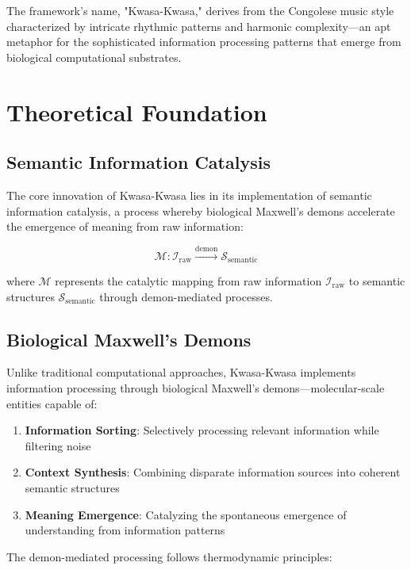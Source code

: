 \documentclass[12pt,a4paper]{article}
\begin{document}
The framework's name, "Kwasa-Kwasa," derives from the Congolese music style characterized by intricate rhythmic patterns and harmonic complexity—an apt metaphor for the sophisticated information processing patterns that emerge from biological computational substrates.

\section{Theoretical Foundation}

\subsection{Semantic Information Catalysis}

The core innovation of Kwasa-Kwasa lies in its implementation of semantic information catalysis, a process whereby biological Maxwell's demons accelerate the emergence of meaning from raw information:

\begin{equation}
\mathcal{M}: \mathcal{I}_{\text{raw}} \xrightarrow{\text{demon}} \mathcal{S}_{\text{semantic}}
\end{equation}

where $\mathcal{M}$ represents the catalytic mapping from raw information $\mathcal{I}_{\text{raw}}$ to semantic structures $\mathcal{S}_{\text{semantic}}$ through demon-mediated processes.

\subsection{Biological Maxwell's Demons}

Unlike traditional computational approaches, Kwasa-Kwasa implements information processing through biological Maxwell's demons—molecular-scale entities capable of:

\begin{enumerate}
\item \textbf{Information Sorting}: Selectively processing relevant information while filtering noise
\item \textbf{Context Synthesis}: Combining disparate information sources into coherent semantic structures
\item \textbf{Meaning Emergence}: Catalyzing the spontaneous emergence of understanding from information patterns
\end{enumerate}

The demon-mediated processing follows thermodynamic principles:
\end{document}
